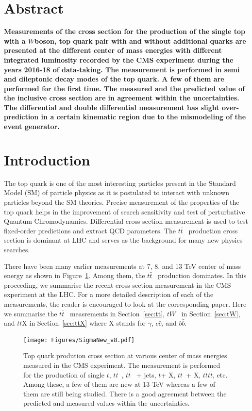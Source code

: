 \documentclass[submission, Proceedings]{SciPost}
\newcommand{\PQt}{\ensuremath{{t}}}
\newcommand{\PAQt}{\ensuremath{{\bar{t}}}}
\newcommand{\ttbar}{{\PQt\PAQt}}
\newcommand{\PW}{\ensuremath{{W}}}
\begin{document}
\section*{Abstract}
{\bf
Measurements of the cross section for the production of the single top with a \PW boson, top quark pair
with and without additional quarks are presented at the different center of mass energies with different
integrated luminosity recorded by the CMS experiment during the years 2016-18 of data-taking. The 
measurement is performed in semi and dileptonic decay modes of the top quark. A few of them 
are performed for the first time. The measured and the predicted value of the inclusive cross 
section are in agreement within the uncertainties. The differential and double differential
measurement has slight over-prediction in a certain kinematic region due to the mismodeling of 
the event generator.
}

\section{Introduction}
\label{sec:intro}
The top quark is one of the most interesting particles present in the Standard Model (SM) of
particle physics as it is postulated to interact with unknown particles beyond the SM
theories. Precise measurement of the properties of the top quark helps in the improvement of 
search sensitivity and test of perturbative Quantum Chromodynamics. Differential cross section 
measurement is used to test fixed-order predictions and extract QCD parameters. The \ttbar~ 
production cross section is dominant at LHC and serves as the background for many new physics searches.

There have been many earlier measurements at 7, 8, and 13 TeV center of mass energy 
as shown in Figure~\ref{fig:xss}. Among them, the \ttbar~ production dominates.
In this proceeding, we summarise the recent cross section measurement in the CMS experiment at the
LHC. For a more detailed description of each of the measurements, the reader is encouraged to look
at the corresponding paper. Here we summarise the \ttbar~ measrements in Section~\ref{sec:tt},
\PQt\PW~ in Section~\ref{sec:tW}, and $\PQt\PQt$X in Section~\ref{sec:ttX} where X stands for $\gamma$, $c\bar{c}$, and $b\bar{b}$.

\begin{figure}[htb!]
\centering
\texttt{[image: Figures/SigmaNew\_v8.pdf]}
\caption{Top quark prodution cross section at various center of mass energies measured in the
    CMS experiment. The measurement is performed for the production of single \PQt, \ttbar~, \ttbar~ + jets, \PQt + X, \ttbar~+ X, \ttbar\ttbar, etc. Among these, a few of them are new at 13 TeV whereas a
    few of them are still being studied. There is a good agreement between the predicted and
    measured values within the uncertainties.}
\label{fig:xss}
\end{figure}
\end{document}
